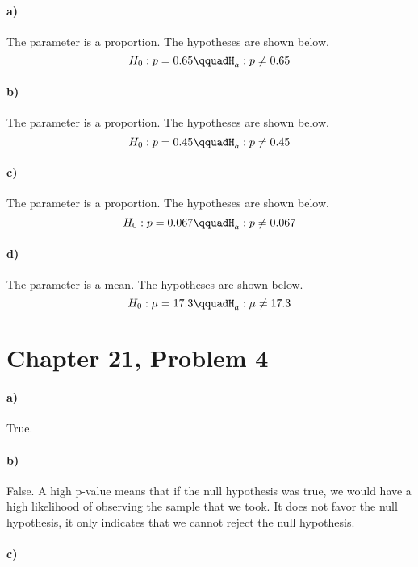 \documentclass[12pt]{article}
\begin{document}
\paragraph{a)}

The parameter is a proportion. The hypotheses are shown below.
\[H_0:p=0.65\qquadH_a:p\neq0.65\]

\paragraph{b)}

The parameter is a proportion. The hypotheses are shown below.
\[H_0:p=0.45\qquadH_a:p\neq0.45\]

\paragraph{c)}

The parameter is a proportion. The hypotheses are shown below.
\[H_0:p=0.067\qquadH_a:p\neq0.067\]

\paragraph{d)}

The parameter is a mean. The hypotheses are shown below.
\[H_0:\mu=17.3\qquadH_a:\mu\neq17.3\]

\section*{Chapter 21, Problem 4}

\paragraph{a)}

True.

\paragraph{b)}

False. A high p-value means that if the null hypothesis was true,
we would have a high likelihood of observing the sample that we took. It
does not favor the null hypothesis, it only indicates that we cannot reject
the null hypothesis.

\paragraph{c)}
\end{document}
